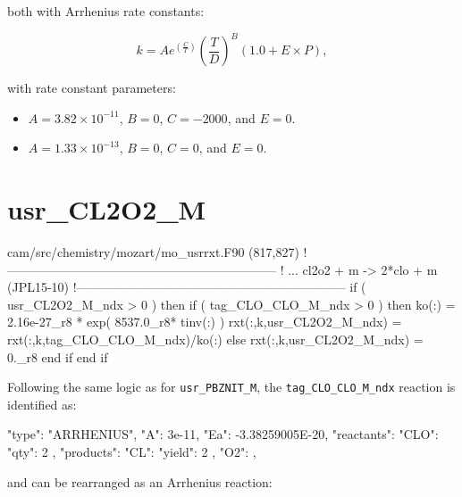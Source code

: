 \documentclass[titlepage]{article}
\begin{document}

\vspace{20px}

\noindent both with Arrhenius rate constants:

\begin{equation}
k = Ae^{(\frac{C}{T})}(\frac{T}{D})^B(1.0+E \times P),
\end{equation}

\noindent with rate constant parameters:

\begin{itemize}
  \item $A = 3.82 \times 10^{-11}$, $B = 0$, $C = -2000$, and $E = 0$.
  \item $A = 1.33 \times 10^{-13}$, $B = 0$, $C = 0$, and $E = 0$.
\end{itemize}


\section{usr\_CL2O2\_M}

\begin{blockcode}[commandchars=\\\{\}]
\color{gray}cam/src/chemistry/mozart/mo_usrrxt.F90 (817,827)
!-----------------------------------------------------------------
!   ... cl2o2 + m -> 2*clo + m  (JPL15-10)
!-----------------------------------------------------------------
       if ( usr_CL2O2_M_ndx > 0 ) then
          if ( tag_CLO_CLO_M_ndx > 0 ) then
             ko(:)            = 2.16e-27_r8 * exp( 8537.0_r8* tinv(:) )
             rxt(:,k,usr_CL2O2_M_ndx) = rxt(:,k,tag_CLO_CLO_M_ndx)/ko(:)
          else
             rxt(:,k,usr_CL2O2_M_ndx) = 0._r8
          end if
       end if
\end{blockcode}

Following the same logic as for \verb>usr_PBZNIT_M>, the \verb>tag_CLO_CLO_M_ndx> reaction is identified as:

\begin{blockcode}
        {
          "type": "ARRHENIUS",
          "A": 3e-11,
          "Ea": -3.38259005E-20,
          "reactants": {
            "CLO": { "qty": 2 }
          },
          "products": {
            "CL": { "yield": 2 },
            "O2": { }
          }
        },
\end{blockcode}

\noindent and can be rearranged as an Arrhenius reaction:
\end{document}
